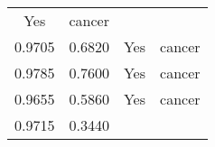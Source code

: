 \documentclass[12pt,]{article}
\begin{document}
\begin{longtable}[]{@{}cccc@{}}
\begin{minipage}[t]{0.22\columnwidth}
Yes\strut
\end{minipage} & \begin{minipage}[t]{0.16\columnwidth}\centering\strut
cancer\strut
\end{minipage}\tabularnewline
\begin{minipage}[t]{0.24\columnwidth}\centering\strut
0.9705\strut
\end{minipage} & \begin{minipage}[t]{0.26\columnwidth}\centering\strut
0.6820\strut
\end{minipage} & \begin{minipage}[t]{0.22\columnwidth}\centering\strut
Yes\strut
\end{minipage} & \begin{minipage}[t]{0.16\columnwidth}\centering\strut
cancer\strut
\end{minipage}\tabularnewline
\begin{minipage}[t]{0.24\columnwidth}\centering\strut
0.9785\strut
\end{minipage} & \begin{minipage}[t]{0.26\columnwidth}\centering\strut
0.7600\strut
\end{minipage} & \begin{minipage}[t]{0.22\columnwidth}\centering\strut
Yes\strut
\end{minipage} & \begin{minipage}[t]{0.16\columnwidth}\centering\strut
cancer\strut
\end{minipage}\tabularnewline
\begin{minipage}[t]{0.24\columnwidth}\centering\strut
0.9655\strut
\end{minipage} & \begin{minipage}[t]{0.26\columnwidth}\centering\strut
0.5860\strut
\end{minipage} & \begin{minipage}[t]{0.22\columnwidth}\centering\strut
Yes\strut
\end{minipage} & \begin{minipage}[t]{0.16\columnwidth}\centering\strut
cancer\strut
\end{minipage}\tabularnewline
\begin{minipage}[t]{0.24\columnwidth}\centering\strut
0.9715\strut
\end{minipage} & \begin{minipage}[t]{0.26\columnwidth}\centering\strut
0.3440\strut
\end{minipage} & \begin{minipage}[t]{0.22\columnwidth}\centering\strut

\end{minipage}
\end{longtable}
\end{document}
